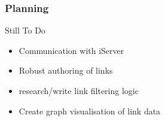 \begin{frame}
	\frametitle{Planning}
	\begin{block}{Still To Do}
		\begin{itemize}
			\item Communication with iServer
			\item Robust authoring of links
			\item research/write link filtering logic
			\item Create graph visualisation of link data
		\end{itemize}
	\end{block}
\end{frame}
